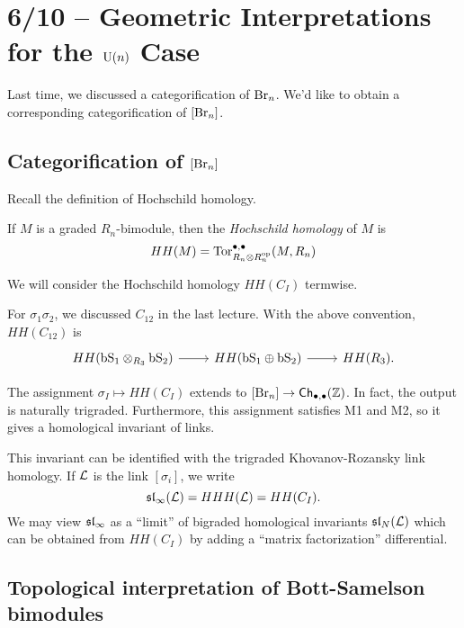 \section{6/10 -- Geometric Interpretations for the $\mathrm{U}(n)$ Case}

Last time, we discussed a categorification of $\mathrm{Br}_n$.
We'd like to obtain a corresponding categorification of $[\mathrm{Br}_n]$.

\subsection{Categorification of $[\mathrm{Br}_n]$}

Recall the definition of Hochschild homology.

\begin{dfn}
	If $M$ is a graded $R_n$-bimodule, then the \emph{Hochschild homology} of $M$ is
	\[
		HH(M) = \operatorname{Tor}^{\bullet,\bullet}_{R_n \otimes R_n^{\mathrm{op}}}(M, R_n)
	\]
\end{dfn}

We will consider the Hochschild homology $HH(C_I)$ termwise.

\begin{ex}
	For $\sigma_1 \sigma_2$, we discussed $C_{12}$ in the last lecture.
	With the above convention, $HH(C_{12})$ is
	\[
		\begin{tikzcd}
			HH(\bS_1 \otimes_{R_3} \bS_2) \rar & HH(\bS_1 \oplus \bS_2) \rar & HH(R_3).
		\end{tikzcd}
	\]
\end{ex}

\begin{thm}[Khovanov]
	The assignment $\sigma_I \mapsto HH(C_I)$ extends to $[\mathrm{Br}_n] \to \mathsf{Ch}_{\bullet,\bullet}(\mathbb{Z})$.
	In fact, the output is naturally trigraded.
	Furthermore, this assignment satisfies M1 and M2, so it gives a homological invariant of links.
\end{thm}
	
This invariant can be identified with the trigraded Khovanov-Rozansky link homology.
If $\mathcal{L}$ is the link $[\sigma_i]$, we write
\[
	\mathfrak{sl}_\infty(\mathcal{L}) = HHH(\mathcal{L}) = HH(C_I).
\]
We may view $\mathfrak{sl}_\infty$ as a ``limit'' of bigraded homological invariants $\mathfrak{sl}_N(\mathcal{L})$ which can be obtained from $HH(C_I)$ by adding a ``matrix factorization'' differential.

\subsection{Topological interpretation of Bott-Samelson bimodules}

